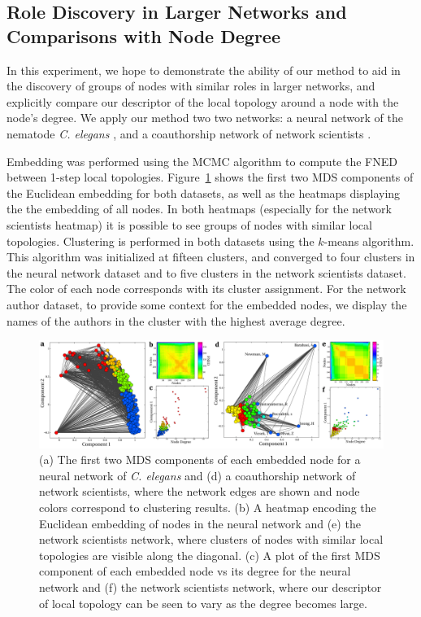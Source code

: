 \documentclass{article}
\begin{document}
\subsection{Role Discovery in Larger Networks and Comparisons with Node Degree}
In this experiment, we hope to demonstrate the ability of our method to aid in the discovery of groups of nodes with similar roles in larger networks, and explicitly compare our descriptor of the local topology around a node with the node's degree. We apply our method two two networks: a neural network of the nematode \emph{C. elegans} \cite{pujol2001reverse,watts1998collective}, and a coauthorship network of network scientists \cite{newman2006finding}.

Embedding was performed using the MCMC algorithm to compute the FNED between 1-step local topologies. Figure~\ref{fig:biggerNetworks} shows the first two MDS components of the Euclidean embedding for both datasets, as well as the heatmaps displaying the the embedding of all nodes. In both heatmaps (especially for the network scientists heatmap) it is possible to see groups of nodes with similar local topologies. Clustering is performed in both datasets using the $k$-means algorithm. This algorithm was initialized at fifteen clusters, and converged to four clusters in the neural network dataset and to five clusters in the network scientists dataset. The color of each node corresponds with its cluster assignment. For the network author dataset, to provide some context for the embedded nodes, we display the names of the authors in the cluster with the highest average degree.

\begin{figure}[h!tbp]
  \centering               
  \includegraphics[width=1\textwidth]{fig/fig5.pdf}
  \caption{(a) The first two MDS components of each embedded node for a neural network of \emph{C. elegans} and (d) a coauthorship network of network scientists, where the network edges are shown and node colors correspond to clustering results. (b) A heatmap encoding the Euclidean embedding of nodes in the neural network and (e) the network scientists network, where clusters of nodes with similar local topologies are visible along the diagonal. (c) A plot of the first MDS component of each embedded node vs its degree for the neural network and (f) the network scientists network, where our descriptor of local topology can be seen to vary as the degree becomes large.}
  \label{fig:biggerNetworks}
\end{figure}
\end{document}
